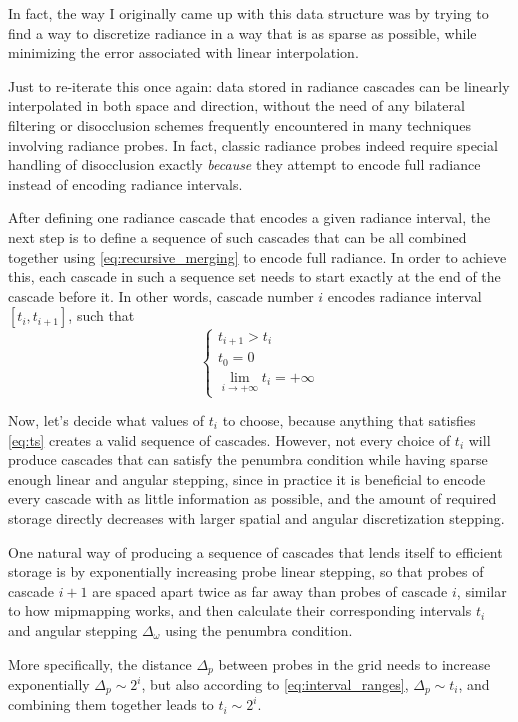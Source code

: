 \documentclass{jcgt}
\begin{document}
In fact, the way I originally came up with this data structure was by trying to find a way to discretize radiance in a way that is as sparse as possible, while minimizing the error associated with linear interpolation.

Just to re-iterate this once again: data stored in radiance cascades can be linearly interpolated in both space and direction, without the need of any bilateral filtering or disocclusion schemes frequently encountered in many techniques involving radiance probes. In fact, classic radiance probes indeed require special handling of disocclusion exactly \emph{because} they attempt to encode full radiance instead of encoding radiance intervals.

After defining one radiance cascade that encodes a given radiance interval, the next step is to define a sequence of such cascades that can be all combined together using \ref{eq:recursive_merging} to encode full radiance.
In order to achieve this, each cascade in such a sequence set needs to start exactly at the end of the cascade before it. In other words, cascade number $i$ encodes radiance interval $[t_i, t_{i+1}]$,
such that
\begin{equation}
  \begin{cases}
    t_{i+1}>t_i \\
    t_0 = 0 \\
    \lim_{i \to +\infty}t_i=+\infty
  \end{cases}
  \label{eq:ts}
\end{equation}

Now, let's decide what values of $t_i$ to choose, because anything that satisfies \ref{eq:ts} creates a valid sequence of cascades. However, not every choice of $t_i$ will produce cascades that can satisfy the penumbra condition while having sparse enough linear and angular stepping, since in practice it is beneficial to encode every cascade with as little information as possible, and the amount of required storage directly decreases with larger spatial and angular discretization stepping.

One natural way of producing a sequence of cascades that lends itself to efficient storage is by exponentially increasing probe linear stepping, so that probes of cascade $i+1$ are spaced apart twice as far away than probes of cascade $i$, similar to how mipmapping works, and then calculate their corresponding intervals $t_i$ and angular stepping $\Delta_\omega$ using the penumbra condition.

More specifically, the distance $\Delta_p$ between probes in the grid needs to increase exponentially $\Delta_p\sim2^i$, but also according to \ref{eq:interval_ranges}, $\Delta_p\sim t_i$, and combining them together leads to $t_i\sim2^i$.
\end{document}
